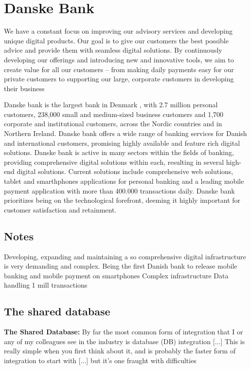 \section{Danske Bank}

\begin{quote_highlight}
We have a constant focus on improving our advisory services and developing unique digital products. Our goal is to give our customers the best possible advice and provide them with seamless digital solutions. By continuously developing our offerings and introducing new and innovative tools, we aim to create value for all our customers – from making daily payments easy for our private customers to supporting our large, corporate customers in developing their business \cite{danske_bank_our_essence}
\end{quote_highlight}

Danske bank is the largest bank in Denmark \cite[p.~38]{danske_bank_setting_up_in_denmark}, with 2.7 million personal customers, 238,000 small and medium-sized business customers and 1,700 corporate and institutional customers, across the Nordic countries and in Northern Ireland. Danske bank offers a wide range of banking services for Danish and international customers, promising highly available and feature rich digital solutions. Danske bank is active in many sectors within the fields of banking, providing comprehensive digital solutions within each, resulting in several high-end digital solutions. Current solutions include comprehensive web solutions, tablet and smarthphones applications for personal banking and a leading mobile payment application with more than 400.000 transactions daily. Danske bank prioritizes being on the technological forefront, deeming it highly important for customer satisfaction and retainment. 

\subsection*{Notes}
Developing, expanding and maintaining a so comprehensive digital infrastructure is very demanding and complex. 
Being the first Danish bank to release mobile banking and mobile payment on smartphones 
Complex infrastructure
Data handling
1 mill transactions

\subsection{The shared database}

\begin{quote_highlight}
\textbf{The Shared Database:} By far the most common form of integration that I or any of my colleagues see in the industry is database (DB) integration [...] This is really simple when you first think about it, and is probably the faster form of integration to start with [...] but it's one fraught with difficulties \cite[p.~41]{newman2015microservices}
\end{quote_highlight}

